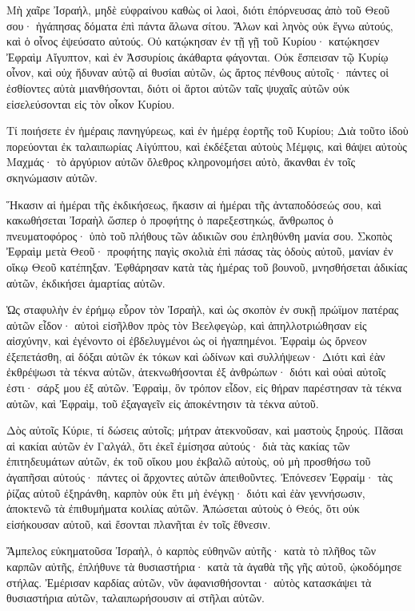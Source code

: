 \begin{spacing}{1.1}
\begin{multicols}{2}
Μὴ χαῖρε Ἰσραήλ, μηδὲ εὐφραίνου καθὼς οἱ λαοὶ, διότι ἐπόρνευσας ἀπὸ τοῦ Θεοῦ σου· ἠγάπησας δόματα ἐπὶ πάντα ἅλωνα σίτου.
Ἅλων καὶ ληνὸς οὐκ ἔγνω αὐτούς, καὶ ὁ οἶνος ἐψεύσατο αὐτούς.
Οὐ κατῴκησαν ἐν τῇ γῇ τοῦ Κυρίου· κατῴκησεν Ἐφραὶμ Αἴγυπτον, καὶ ἐν Ἀσσυρίοις ἀκάθαρτα φάγονται.
Οὐκ ἔσπεισαν τῷ Κυρίῳ οἶνον, καὶ οὐχ ἥδυναν αὐτῷ αἱ θυσίαι αὐτῶν, ὡς ἄρτος πένθους αὐτοῖς· πάντες οἱ ἐσθίοντες αὐτὰ μιανθήσονται, διότι οἱ ἄρτοι αὐτῶν ταῖς ψυχαῖς αὐτῶν οὐκ εἰσελεύσονται εἰς τὸν οἶκον Κυρίου.

Τί ποιήσετε ἐν ἡμέραις πανηγύρεως, καὶ ἐν ἡμέρᾳ ἑορτῆς τοῦ Κυρίου;
Διὰ τοῦτο ἰδοὺ πορεύονται ἐκ ταλαιπωρίας Αἰγύπτου, καὶ ἐκδέξεται αὐτοὺς Μέμφις, καὶ θάψει αὐτοὺς Μαχμάς· τὸ ἀργύριον αὐτῶν ὄλεθρος κληρονομήσει αὐτὸ, ἄκανθαι ἐν τοῖς σκηνώμασιν αὐτῶν.

Ἥκασιν αἱ ἡμέραι τῆς ἐκδικήσεως, ἥκασιν αἱ ἡμέραι τῆς ἀνταποδόσεώς σου, καὶ κακωθήσεται Ἰσραὴλ ὥσπερ ὁ προφήτης ὁ παρεξεστηκώς, ἄνθρωπος ὁ πνευματοφόρος· ὑπὸ τοῦ πλήθους τῶν ἀδικιῶν σου ἐπληθύνθη μανία σου.
Σκοπὸς Ἐφραὶμ μετὰ Θεοῦ· προφήτης παγὶς σκολιὰ ἐπὶ πάσας τὰς ὁδοὺς αὐτοῦ, μανίαν ἐν οἴκῳ Θεοῦ κατέπηξαν.
Ἐφθάρησαν κατὰ τὰς ἡμέρας τοῦ βουνοῦ, μνησθήσεται ἀδικίας αὐτῶν, ἐκδικήσει ἁμαρτίας αὐτῶν.

Ὡς σταφυλὴν ἐν ἐρήμῳ εὗρον τὸν Ἰσραὴλ, καὶ ὡς σκοπὸν ἐν συκῇ πρώϊμον πατέρας αὐτῶν εἶδον· αὐτοὶ εἰσῆλθον πρὸς τὸν Βεελφεγὼρ, καὶ ἀπηλλοτριώθησαν εἰς αἰσχύνην, καὶ ἐγένοντο οἱ ἐβδελυγμένοι ὡς οἱ ἠγαπημένοι.
Ἐφραὶμ ὡς ὄρνεον ἐξεπετάσθη, αἱ δόξαι αὐτῶν ἐκ τόκων καὶ ὠδίνων καὶ συλλήψεων·
Διότι καὶ ἐὰν ἐκθρέψωσι τὰ τέκνα αὐτῶν, ἀτεκνωθήσονται ἐξ ἀνθρώπων· διότι καὶ οὐαὶ αὐτοῖς ἐστι· σάρξ μου ἐξ αὐτῶν.
Ἐφραὶμ, ὃν τρόπον εἶδον, εἰς θήραν παρέστησαν τὰ τέκνα αὐτῶν, καὶ Ἐφραὶμ, τοῦ ἐξαγαγεῖν εἰς ἀποκέντησιν τὰ τέκνα αὐτοῦ.

Δὸς αὐτοῖς Κύριε, τί δώσεις αὐτοῖς; μήτραν ἀτεκνοῦσαν, καὶ μαστοὺς ξηρούς.
Πᾶσαι αἱ κακίαι αὐτῶν ἐν Γαλγάλ, ὅτι ἐκεῖ ἐμίσησα αὐτούς· διὰ τὰς κακίας τῶν ἐπιτηδευμάτων αὐτῶν, ἐκ τοῦ οἴκου μου ἐκβαλῶ αὐτοὺς, οὐ μὴ προσθήσω τοῦ ἀγαπῆσαι αὐτούς· πάντες οἱ ἄρχοντες αὐτῶν ἀπειθοῦντες.
Ἐπόνεσεν Ἐφραίμ· τὰς ῥίζας αὐτοῦ ἐξηράνθη, καρπὸν οὐκ ἔτι μὴ ἐνέγκῃ· διότι καὶ ἐὰν γεννήσωσιν, ἀποκτενῶ τὰ ἐπιθυμήματα κοιλίας αὐτῶν.
Ἀπώσεται αὐτοὺς ὁ Θεός, ὅτι οὐκ εἰσήκουσαν αὐτοῦ, καὶ ἔσονται πλανῆται ἐν τοῖς ἔθνεσιν.

Ἄμπελος εὐκηματοῦσα Ἰσραὴλ, ὁ καρπὸς εὐθηνῶν αὐτῆς· κατὰ τὸ πλῆθος τῶν καρπῶν αὐτῆς, ἐπλήθυνε τὰ θυσιαστήρια· κατὰ τὰ ἀγαθὰ τῆς γῆς αὐτοῦ, ᾠκοδόμησε στήλας.
Ἐμέρισαν καρδίας αὐτῶν, νῦν ἀφανισθήσονται· αὐτὸς κατασκάψει τὰ θυσιαστήρια αὐτῶν, ταλαιπωρήσουσιν αἱ στῆλαι αὐτῶν.


\end{multicols}
\end{spacing}
